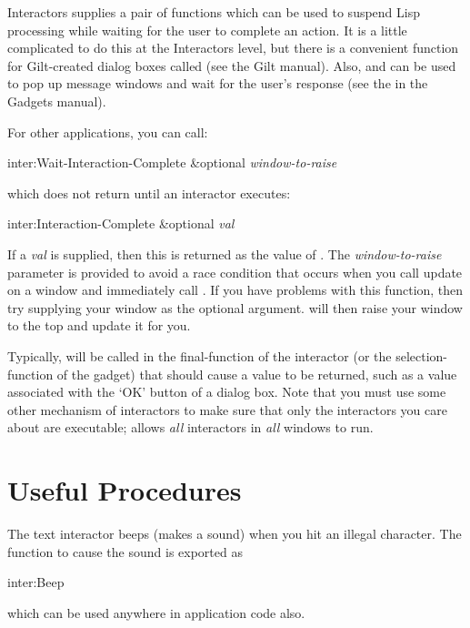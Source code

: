 Interactors supplies a pair of functions which can be used to suspend
Lisp processing while waiting for the user to complete an action.
It is a little complicated to do this at the Interactors level,
but there is a convenient function for Gilt-created dialog boxes called
 (see the Gilt manual).  Also,
 and
 can be used to pop up
message windows and wait for the user's response (see the
 in the Gadgets manual).

For other applications, you can call:
\begin{programexample}
inter:Wait-Interaction-Complete \&optional {\it window-to-raise}\value{function}
\end{programexample}
which does not return until an interactor executes:
\begin{programexample}
inter:Interaction-Complete \&optional {\it val}\value{function}
\end{programexample}
If a {\it val} is supplied, then this is returned as the value of
.  The {\it window-to-raise} parameter is
provided to avoid a race condition that occurs when you call update on a
window and
immediately call .  If you have problems with
this function, then try supplying your window as the optional argument.
 will then raise your window to the top and
update it for you.


Typically,  will be called in the
final-function of the interactor (or the selection-function of the gadget)
that should cause a value to be returned, such as a value associated with
the `OK' button of a dialog box.  Note that you must use some other mechanism
of interactors to make sure that only the interactors you care about are
executable;  allows {\it all} interactors in
{\it all} windows to run.




\section{Useful Procedures}

The text interactor beeps (makes a sound) when you hit an illegal
character.  The function
to cause the sound is exported as
\begin{programexample}
inter:Beep\value{function}
\end{programexample}
which can be used anywhere in application code also.


